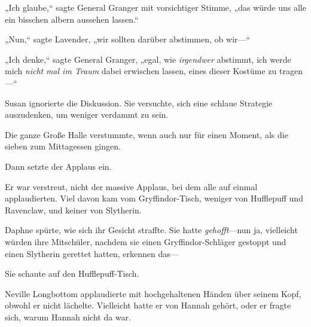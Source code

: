 „Ich glaube,“ sagte General Granger mit vorsichtiger Stimme, „das würde uns alle ein bisschen albern aussehen lassen.“

„Nun,“ sagte Lavender, „wir sollten darüber abstimmen, ob wir—“

„Ich denke,“ sagte General Granger, „egal, wie \emph{irgendwer} abstimmt, ich werde mich \emph{nicht} \emph{mal im Traum} dabei erwischen lassen, eines dieser Kostüme zu tragen—“

Susan ignorierte die Diskussion. Sie versuchte, sich eine schlaue Strategie auszudenken, um weniger verdammt zu sein.

\later

Die ganze Große Halle verstummte, wenn auch nur für einen Moment, als die sieben zum Mittagessen gingen.

Dann setzte der Applaus ein.

Er war verstreut, nicht der massive Applaus, bei dem alle auf einmal applaudierten. Viel davon kam vom Gryffindor-Tisch, weniger von Hufflepuff und Ravenclaw, und keiner von Slytherin.

Daphne spürte, wie sich ihr Gesicht straffte. Sie hatte \emph{gehofft}—nun ja, vielleicht würden ihre Mitschüler, nachdem sie einen Gryffindor-Schläger gestoppt und einen Slytherin gerettet hatten, erkennen das—

Sie schaute auf den Hufflepuff-Tisch.

Neville Longbottom applaudierte mit hochgehaltenen Händen über seinem Kopf, obwohl er nicht lächelte. Vielleicht hatte er von Hannah gehört, oder er fragte sich, warum Hannah nicht da war.

